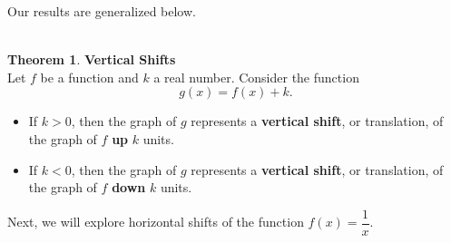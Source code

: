 \documentclass[11pt]{book}
\theoremstyle{definition}  %
\newtheorem{thm}{Theorem}[chapter] %
\newcommand{\bbm}{\begin{boxedminipage}{4.80in}} %
\newcommand{\ebm}{\end{boxedminipage}}
\begin{document}
Our results are generalized below.\\
~\\
\smallskip
\bbm
\begin{thm}\label{vshifts}\textbf{Vertical Shifts}\\
Let $f$ be a function and $k$ a real number.  Consider the function
$$g(x)=f(x)+k.$$
\begin{itemize}
\item If $k>0$, then the graph of $g$ represents a \textbf{vertical shift}, or translation, of the graph of $f$ \textbf{up} $k$ units.
\item If $k<0$, then the graph of $g$ represents a \textbf{vertical shift}, or translation, of the graph of $f$ \textbf{down} $k$ units.
\end{itemize}
\end{thm}
\ebm
\smallskip

Next, we will explore horizontal shifts of the function $f(x)=\dfrac{1}{x}$.
\end{document}

